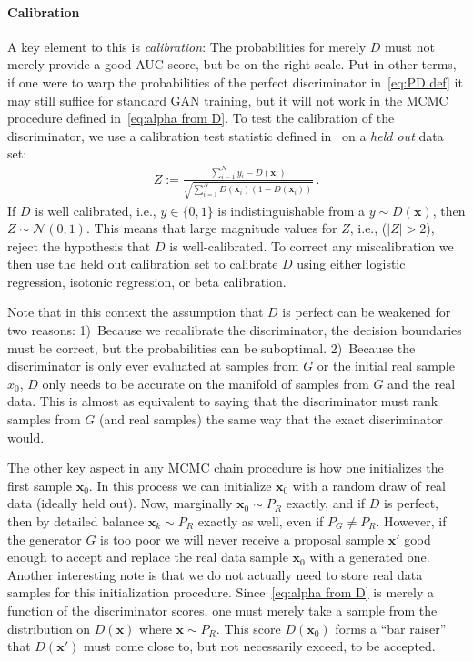 \documentclass{article}
\renewcommand{\vec}[1]{{\boldsymbol{\mathbf{#1}}}} %
\newcommand{\sample}{\sim}
\newcommand{\norm}{\mathcal{N}}
\begin{document}
\paragraph{Calibration}
A key element to this is \emph{calibration}: The probabilities for merely $D$ must not merely provide a good AUC score, but be on the right scale.
Put in other terms, if one were to warp the probabilities of the perfect discriminator in~\eqref{eq:PD def} it may still suffice for standard GAN training, but it will not work in the MCMC procedure defined in~\eqref{eq:alpha from D}.
To test the calibration of the discriminator, we use a calibration test statistic defined in~\citet{} on a \emph{held out} data set:  %
\begin{align}
  Z := \frac{\sum_{i=1}^N y_i - D(\vec x_i)}{\sqrt{\sum_{i=1}^N D(\vec x_i) (1 - D(\vec x_i))}}\,.
\end{align}
If $D$ is well calibrated, i.e., $y \in \{0,1\}$ is indistinguishable from a $y \sample D(\vec x)$, then $Z \sample \norm(0,1)$.
This means that large magnitude values for $Z$, i.e., ($|Z| > 2$), reject the hypothesis that $D$ is well-calibrated.
To correct any miscalibration we then use the held out calibration set to calibrate $D$ using either logistic regression, isotonic regression, or beta calibration.

Note that in this context the assumption that $D$ is perfect can be weakened for two reasons:
1)~Because we recalibrate the discriminator, the decision boundaries must be correct, but the probabilities can be suboptimal.
2)~Because the discriminator is only ever evaluated at samples from $G$ or the initial real sample $x_0$, $D$ only needs to be accurate on the manifold of samples from $G$ and the real data.
This is almost as equivalent to saying that the discriminator must rank samples from $G$ (and real samples) the same way that the exact discriminator would.

The other key aspect in any MCMC chain procedure is how one initializes the first sample $\vec x_0$.
In this process we can initialize $\vec x_0$ with a random draw of real data (ideally held out)\@.
Now, marginally $\vec x_0 \sample P_R$ exactly, and if $D$ is perfect, then by detailed balance $\vec x_k \sample P_R$ exactly as well, even if $P_G \neq P_R$.
However, if the generator $G$ is too poor we will never receive a proposal sample $\vec x'$ good enough to accept and replace the real data sample $\vec x_0$ with a generated one.
Another interesting note is that we do not actually need to store real data samples for this initialization procedure.
Since~\eqref{eq:alpha from D} is merely a function of the discriminator scores, one must merely take a sample from the distribution on $D(\vec x)$ where $\vec x \sample P_R$.
This score $D(\vec x_0)$ forms a ``bar raiser'' that $D(\vec x')$ must come close to, but not necessarily exceed, to be accepted.
\end{document}
